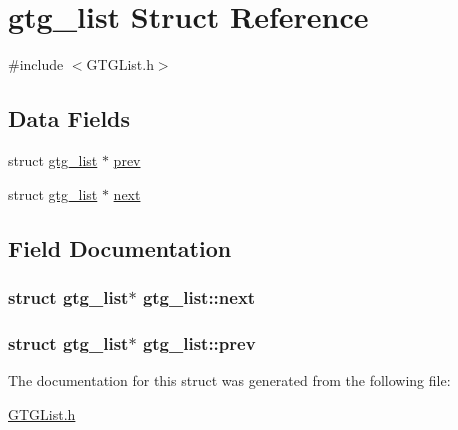 \hypertarget{structgtg__list}{\section{gtg\-\_\-list Struct Reference}
\label{structgtg__list}
}


{\ttfamily \#include $<$G\-T\-G\-List.\-h$>$}

\subsection*{Data Fields}
\begin{DoxyCompactItemize}
\item 
struct \hyperlink{structgtg__list}{gtg\-\_\-list} $\ast$ \hyperlink{structgtg__list_ab82d200f55762c3c8f45466d772ce18b}{prev}
\item 
struct \hyperlink{structgtg__list}{gtg\-\_\-list} $\ast$ \hyperlink{structgtg__list_a345eec26112d216eb50414c089292381}{next}
\end{DoxyCompactItemize}


\subsection{Field Documentation}
\hypertarget{structgtg__list_a345eec26112d216eb50414c089292381}{
\subsubsection[{next}]{\setlength{\rightskip}{0pt plus 5cm}struct {\bf gtg\-\_\-list}$\ast$ gtg\-\_\-list\-::next}}\label{structgtg__list_a345eec26112d216eb50414c089292381}
\hypertarget{structgtg__list_ab82d200f55762c3c8f45466d772ce18b}{
\subsubsection[{prev}]{\setlength{\rightskip}{0pt plus 5cm}struct {\bf gtg\-\_\-list}$\ast$ gtg\-\_\-list\-::prev}}\label{structgtg__list_ab82d200f55762c3c8f45466d772ce18b}


The documentation for this struct was generated from the following file\-:\begin{DoxyCompactItemize}
\item 
\hyperlink{GTGList_8h}{G\-T\-G\-List.\-h}\end{DoxyCompactItemize}
